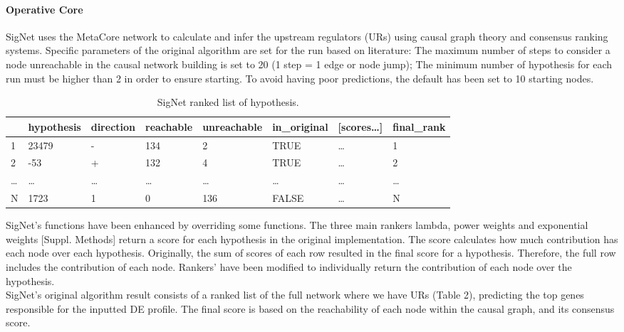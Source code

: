 \paragraph{Operative Core}
SigNet uses the MetaCore network to calculate and infer the upstream regulators (URs) using causal graph theory and consensus ranking systems. Specific parameters of the original algorithm are set for the run based on literature: The maximum number of steps to consider a node unreachable in the causal network building is set to 20 (1 step = 1 edge or node jump); The minimum number of hypothesis for each run must be higher than 2 in order to ensure starting. To avoid having poor predictions, the default has been set to 10 starting nodes.
\\
\begin{table}[!h]
\begin{tabular}{|l|l|l|l|l|l|l|l|}
\hline
  & hypothesis & direction & reachable & unreachable & in\_original & {[}scores…{]} & final\_rank \\ \hline
1 & 23479      & -         & 134       & 2           & TRUE         & …             & 1           \\ \hline
2 & -53        & +         & 132       & 4           & TRUE         & …             & 2           \\ \hline
… & …          & …         & …         & …           & …            & …             & …           \\ \hline
N & 1723       & 1         & 0         & 136         & FALSE        & …             & N           \\ \hline
\end{tabular}
\caption{SigNet ranked list of hypothesis.}
\label{tbl:signet_output}
\end{table}

SigNet’s functions have been enhanced by overriding some functions. The three main rankers lambda, power weights and exponential weights [Suppl. Methods] return a score for each hypothesis in the original implementation. The score calculates how much contribution has each node over each hypothesis. Originally, the sum of scores of each row resulted in the final score for a hypothesis. Therefore, the full row includes the contribution of each node. Rankers’ have been modified to individually return the contribution of each node over the hypothesis.
\\

SigNet’s original algorithm result consists of a ranked list of the full network where we have URs (Table 2), predicting the top genes responsible for the inputted DE profile. The final score is based on the reachability of each node within the causal graph, and its consensus score.
\\

